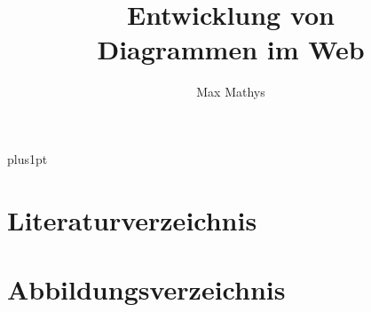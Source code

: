 \documentclass[12pt]{document}  %
\title{Entwicklung von\\[1ex]     %
       Diagrammen im Web}   %
\author{Max Mathys}             %
\begin{document}
\baselineskip=18pt plus1pt

\setcounter{secnumdepth}{3}
\setcounter{tocdepth}{3}


\maketitle                  %


\begin{romanpages}          %
\tableofcontents            %
\end{romanpages}            %



	
	



\newpage
\appendix

\chapter{Literaturverzeichnis}
\printbibliography[heading=none]     %

\newpage
\chapter{Abbildungsverzeichnis}
\makeatletter
{} %
\makeatother

\newpage

\end{document}
